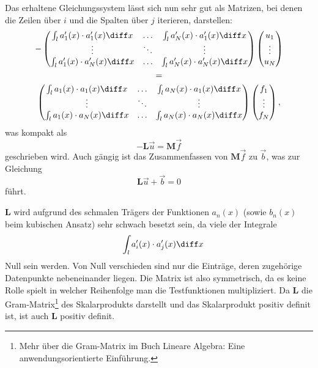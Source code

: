 Das erhaltene Gleichungssystem lässt sich nun sehr gut als Matrizen, bei denen die Zeilen über $i$ und die Spalten über $j$ iterieren, darstellen:
\begin{multline}
    -\left(
        \begin{matrix}
            \int_l a'_1(x) \cdot a'_1(x) \diff x & \hdots & \int_l a'_N(x) \cdot a'_1(x) \diff x \\
            \vdots                               & \ddots & \vdots                               \\
            \int_l a'_1(x) \cdot a'_N(x) \diff x & \hdots & \int_l a'_N(x) \cdot a'_N(x) \diff x \\
        \end{matrix}
    \right)
    \left(
        \begin{matrix}
            u_1 \\
            \vdots \\
            u_N
        \end{matrix}
    \right) \\
    = \\
    \left(
        \begin{matrix}
            \int_l a_1(x) \cdot a_1(x) \diff x & \hdots & \int_l a_N(x) \cdot a_1(x) \diff x \\
            \vdots                             & \ddots & \vdots                             \\
            \int_l a_1(x) \cdot a_N(x) \diff x & \hdots & \int_l a_N(x) \cdot a_N(x) \diff x \\
        \end{matrix}
    \right)
    \left(
        \begin{matrix}
            f_1 \\
            \vdots \\
            f_N
        \end{matrix}
    \right),
\end{multline}
was kompakt als
\begin{equation}
    -\mathbf{L}\vec{u} = \mathbf{M}\vec{f}
\end{equation}
geschrieben wird.
Auch gängig ist das Zusammenfassen von $\mathbf{M}\vec{f}$ zu $\vec{b}$, was zur Gleichung
\begin{equation}
    \mathbf{L}\vec{u} + \vec{b} = 0
\end{equation}
führt.

$\mathbf{L}$ wird aufgrund des schmalen Trägers der Funktionen $a_n(x)$ (sowie $b_n(x)$ beim kubischen Ansatz) sehr schwach besetzt sein, da viele der Integrale
\begin{equation}
    \quad \int_l a'_i(x) \cdot a'_j(x) \diff x 
\end{equation}
Null sein werden.
Von Null verschieden sind nur die Einträge, deren zugehörige Datenpunkte nebeneinander liegen.
Die Matrix ist also symmetrisch, da es keine Rolle spielt in welcher Reihenfolge man die Testfunktionen multipliziert.
Da $\mathbf{L}$ die Gram-Matrix\footnote{Mehr über die Gram-Matrix im Buch Lineare Algebra: Eine anwendungsorientierte Einführung\cite{buch:linalg}.} des Skalarprodukts darstellt und das Skalarprodukt positiv definit ist, ist auch $\mathbf{L}$ positiv definit.

